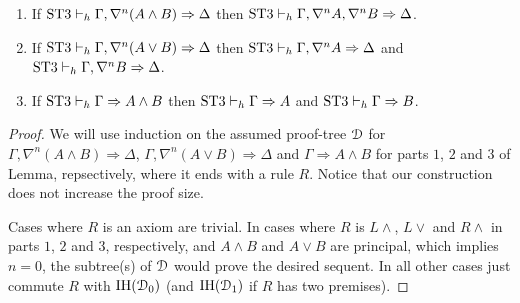 \documentclass[10pt,a4paper]{amsart}
\begin{document}
\begin{lem}[Inversion]\label{lem:stt-inversion} \quad
	\begin{enumerate}
		\item If $\text{ST3} \vdash_h \Gamma, \nabla^n (A \wedge B) \Rightarrow \Delta$ then $\text{ST3} \vdash_h \Gamma, \nabla^n A, \nabla^n B \Rightarrow \Delta$.
		\item If $\text{ST3} \vdash_h \Gamma, \nabla^n (A \vee B) \Rightarrow \Delta$ then $\text{ST3} \vdash_h \Gamma, \nabla^n A \Rightarrow \Delta$ and $\text{ST3} \vdash_h \Gamma, \nabla^n B \Rightarrow \Delta$.
		\item If $\text{ST3} \vdash_h \Gamma \Rightarrow A \wedge B$ then $\text{ST3} \vdash_h \Gamma \Rightarrow A$ and $\text{ST3} \vdash_h \Gamma \Rightarrow B$.
	\end{enumerate}
\end{lem}
\begin{proof}
	We will use induction on the assumed proof-tree $\mathcal{D}$ for $\Gamma, \nabla^n (A \wedge B) \Rightarrow \Delta$, $\Gamma, \nabla^n (A \vee B) \Rightarrow \Delta$ and $\Gamma \Rightarrow A \wedge B$ for parts $1$, $2$ and $3$ of Lemma, repsectively, where it ends with a rule $R$. Notice that our construction does not increase the proof size.

	Cases where $R$ is an axiom are trivial. In cases where $R$ is $L \wedge$, $L \vee$ and $R \wedge$ in parts $1$, $2$ and $3$, respectively, and $A \wedge B$ and $A \vee B$ are principal, which implies $n = 0$, the subtree(s) of $\mathcal{D}$ would prove the desired sequent. In all other cases just commute $R$ with $\text{IH}(\mathcal{D}_0)$ (and $\text{IH}(\mathcal{D}_1)$ if $R$ has two premises).	
\end{proof}
\end{document}
